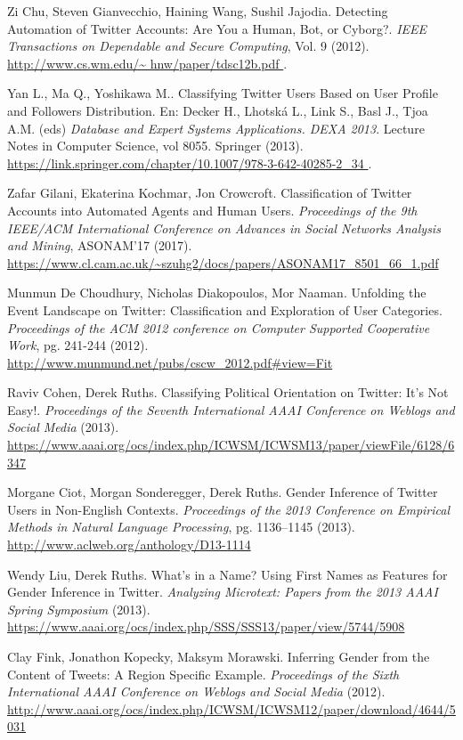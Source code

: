 \begin{thebibliography}{3}
 Zi Chu, Steven Gianvecchio, Haining Wang, Sushil Jajodia. 
Detecting Automation of Twitter Accounts: Are You a Human, Bot, or Cyborg?.
{\em IEEE Transactions on Dependable and Secure Computing}, Vol. 9 (2012).
\url{http://www.cs.wm.edu/\~ hnw/paper/tdsc12b.pdf }.

 Yan L., Ma Q., Yoshikawa M.. Classifying Twitter Users Based on User Profile and Followers Distribution. En: Decker H., Lhotská L., Link S., Basl J., Tjoa A.M. (eds) {\em Database and Expert Systems Applications. DEXA 2013}. Lecture Notes in Computer Science, vol 8055. Springer (2013).
\url{https://link.springer.com/chapter/10.1007/978-3-642-40285-2_34 }.

 Zafar Gilani, Ekaterina Kochmar, Jon Crowcroft. Classification 
of Twitter Accounts into Automated Agents and Human Users.
{\em Proceedings of the 9th IEEE/ACM International Conference on Advances in 
Social Networks Analysis and Mining}, ASONAM'17 (2017).
\url{https://www.cl.cam.ac.uk/~szuhg2/docs/papers/ASONAM17_8501_66_1.pdf }

 Munmun De Choudhury, Nicholas Diakopoulos,
Mor Naaman. Unfolding the Event Landscape on Twitter:
Classification and Exploration of User Categories. 
{\em Proceedings of the ACM 2012 conference on Computer Supported Cooperative 
Work}, pg. 241-244 (2012).
\url{http://www.munmund.net/pubs/cscw_2012.pdf#view=Fit }

 Raviv Cohen, Derek Ruths. Classifying Political Orientation on Twitter: 
It’s Not Easy!. {\em Proceedings of the Seventh International AAAI Conference on Weblogs and 
Social Media} (2013).
\url{ https://www.aaai.org/ocs/index.php/ICWSM/ICWSM13/paper/viewFile/6128/6347   }


 Morgane Ciot, Morgan Sonderegger, Derek Ruths. 
Gender Inference of Twitter Users in Non-English Contexts.
{\em Proceedings of the 2013 Conference on Empirical Methods in Natural Language Processing},
pg. 1136–1145 (2013).
\url{ http://www.aclweb.org/anthology/D13-1114 }

 Wendy Liu, Derek Ruths. What’s in a Name? Using First Names as Features 
for Gender Inference in Twitter.
{\em Analyzing Microtext: Papers from the 2013 AAAI Spring Symposium} (2013).
\url{ https://www.aaai.org/ocs/index.php/SSS/SSS13/paper/view/5744/5908 }

 Clay Fink, Jonathon Kopecky, Maksym Morawski. Inferring Gender from 
the Content of Tweets: A Region Specific Example.
{\em Proceedings of the Sixth International AAAI Conference on Weblogs and Social Media} (2012).
\url{ http://www.aaai.org/ocs/index.php/ICWSM/ICWSM12/paper/download/4644/5031 }


\end{thebibliography}
